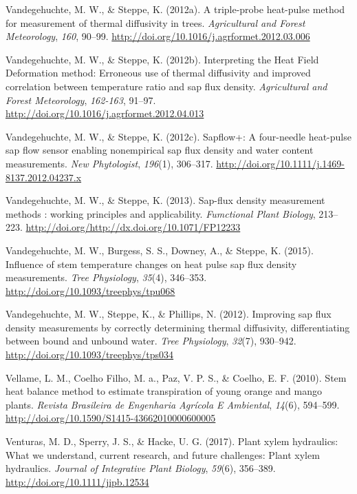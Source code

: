\documentclass[11pt,twoside]{reedthesis}
\begin{document}
\hypertarget{ref-Vandegehuchte2012}{}
Vandegehuchte, M. W., \& Steppe, K. (2012a). A triple-probe heat-pulse
method for measurement of thermal diffusivity in trees.
\emph{Agricultural and Forest Meteorology}, \emph{160}, 90--99.
\url{http://doi.org/10.1016/j.agrformet.2012.03.006}

\hypertarget{ref-Vandegehuchte2012a}{}
Vandegehuchte, M. W., \& Steppe, K. (2012b). Interpreting the Heat Field
Deformation method: Erroneous use of thermal diffusivity and improved
correlation between temperature ratio and sap flux density.
\emph{Agricultural and Forest Meteorology}, \emph{162-163}, 91--97.
\url{http://doi.org/10.1016/j.agrformet.2012.04.013}

\hypertarget{ref-Vandegehuchte2012c}{}
Vandegehuchte, M. W., \& Steppe, K. (2012c). Sapflow+: A four-needle
heat-pulse sap flow sensor enabling nonempirical sap flux density and
water content measurements. \emph{New Phytologist}, \emph{196}(1),
306--317. \url{http://doi.org/10.1111/j.1469-8137.2012.04237.x}

\hypertarget{ref-Vandegehuchte2013}{}
Vandegehuchte, M. W., \& Steppe, K. (2013). Sap-flux density measurement
methods : working principles and applicability. \emph{Fumctional Plant
Biology}, 213--223.
\url{http://doi.org/http://dx.doi.org/10.1071/FP12233}

\hypertarget{ref-Vandegehuchte2015}{}
Vandegehuchte, M. W., Burgess, S. S., Downey, A., \& Steppe, K. (2015).
Influence of stem temperature changes on heat pulse sap flux density
measurements. \emph{Tree Physiology}, \emph{35}(4), 346--353.
\url{http://doi.org/10.1093/treephys/tpu068}

\hypertarget{ref-Vandegehuchte2012b}{}
Vandegehuchte, M. W., Steppe, K., \& Phillips, N. (2012). Improving sap
flux density measurements by correctly determining thermal diffusivity,
differentiating between bound and unbound water. \emph{Tree Physiology},
\emph{32}(7), 930--942. \url{http://doi.org/10.1093/treephys/tps034}

\hypertarget{ref-Vellame2010}{}
Vellame, L. M., Coelho Filho, M. a., Paz, V. P. S., \& Coelho, E. F.
(2010). Stem heat balance method to estimate transpiration of young
orange and mango plants. \emph{Revista Brasileira de Engenharia Agrícola
E Ambiental}, \emph{14}(6), 594--599.
\url{http://doi.org/10.1590/S1415-43662010000600005}

\hypertarget{ref-venturas_plant_2017}{}
Venturas, M. D., Sperry, J. S., \& Hacke, U. G. (2017). Plant xylem
hydraulics: What we understand, current research, and future challenges:
Plant xylem hydraulics. \emph{Journal of Integrative Plant Biology},
\emph{59}(6), 356--389. \url{http://doi.org/10.1111/jipb.12534}
\end{document}
